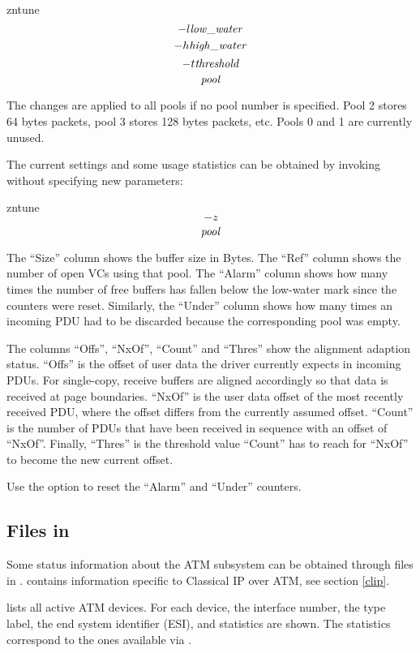 \begin{command}
zntune \[-l {\it low\_water\/}\] \[-h {\it high\_water\/}\]
  \[-t {\it threshold\/}\]  \[{\it pool\/}\]
\end{command}

The changes are applied to all pools if no pool number is specified.
Pool 2 stores 64 bytes packets, pool 3 stores 128 bytes packets, etc.
Pools 0 and 1 are currently unused.

The current settings and some usage statistics can be obtained by invoking
 without specifying new parameters:

\begin{command}
zntune \[-z\]  \[{\it pool\/}\]
\end{command}

The ``Size'' column shows the buffer size in Bytes.
The ``Ref'' column shows the number of open VCs using that pool. The ``Alarm''
column shows how many times the number of free buffers has fallen below the
low-water mark since the counters were reset. Similarly, the ``Under'' column
shows how many times an incoming PDU had to be discarded because the
corresponding pool was empty.

The columns ``Offs'', ``NxOf'', ``Count'' and ``Thres'' show the alignment
adaption status. ``Offs'' is the offset of user data the driver currently
expects in incoming PDUs. For single-copy, receive buffers are aligned
accordingly so that data is received at page boundaries. ``NxOf'' is the
user data offset of the most recently received PDU, where the offset differs
from the currently assumed offset. ``Count'' is the number of PDUs that have
been received in sequence with an offset of ``NxOf''. Finally, ``Thres'' is
the threshold value ``Count'' has to reach for ``NxOf'' to become the new
current offset.

Use the  option to reset the ``Alarm'' and ``Under'' counters.


\subsection{Files in }

Some status information about the ATM subsystem can be obtained through files
in .  contains information
specific to Classical IP over ATM, see section \ref{clip}.

 lists all active ATM devices. For each device,
the interface number, the type label, the end system identifier (ESI), and
statistics are shown. The statistics correspond to the ones available via
.


